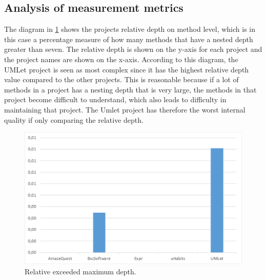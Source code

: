 \documentclass[conference]{IEEEtran}
\begin{document}
\subsection{Analysis of measurement metrics}
\label{ssec:analysis}
The diagram in \cref{fig:exceed_depth} shows the projects relative depth on method level, which is in this case a percentage measure of how many methods that have a nested depth greater than seven. The relative depth is shown on the y-axis for each project and the project names are shown on the x-axis. According to this diagram, the UMLet project is seen as most complex since it   has the highest relative depth value compared to the other projects. This is reasonable because if a lot of methods in a project has a nesting depth that is very large, the methods in that project become difficult to understand, which also leads to difficulty in maintaining that project. The Umlet project has therefore the worst internal quality if only comparing the relative depth. 
\begin{figure}
    \includegraphics[width=\columnwidth]{img/rel_exceeded_depth.png}
\caption{Relative exceeded maximum depth.}
\label{fig:exceed_depth}
\end{figure}
\end{document}
